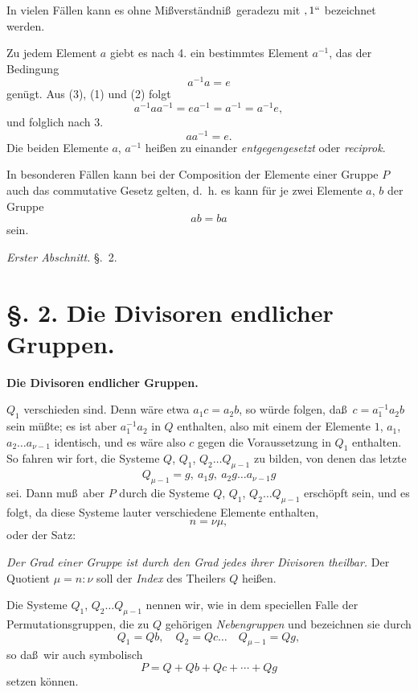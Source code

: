 \documentclass[12pt,a4paper]{book}
\begin{document}
In vielen F\"allen kann es ohne Mi\ss verst\"andni\ss\ geradezu mit $,1``$ bezeichnet werden.

Zu jedem Element $a$ giebt es nach 4. ein bestimmtes Element $a^{-1}$, das der Bedingung
\begin{equation}
a^{-1}a = e
\end{equation}
gen\"ugt. Aus (3), (1) und (2) folgt
\[a^{-1}aa^{-1} = ea^{-1} = a^{-1} = a^{-1}e,\]
und folglich nach 3.
\begin{equation}
aa^{-1} = e.
\end{equation}
Die beiden Elemente $a$, $a^{-1}$ hei\ss en zu einander \textit{entgegengesetzt} oder \textit{reciprok}.

In besonderen F\"allen kann bei der Composition der Elemente einer Gruppe $P$ auch das commutative Gesetz gelten, d.~h. es kann f\"ur je zwei Elemente $a$, $b$ der Gruppe
\[ab = ba\]
sein.

\newpage
{} \hfill \textit{Erster Abschnitt.} \hfill \S.~2.

\vspace{0.3cm}

\section*{\S. 2. Die Divisoren endlicher Gruppen.}

\begin{center}
\textbf{Die Divisoren endlicher Gruppen.}
\end{center}

$Q_1$ verschieden sind. Denn w\"are etwa $a_1c = a_2b$, so w\"urde folgen, da\ss\ $c = a_1^{-1}a_2b$ sein m\"u\ss te; es ist aber $a_1^{-1}a_2$ in $Q$ enthalten, also mit einem der Elemente $1$, $a_1$, $a_2 \ldots a_{\nu-1}$ identisch, und es w\"are also $c$ gegen die Voraussetzung in $Q_1$ enthalten. So fahren wir fort, die Systeme $Q$, $Q_1$, $Q_2 \ldots Q_{\mu-1}$ zu bilden, von denen das letzte
\[Q_{\mu-1} = g,\ a_1g,\ a_2g \ldots a_{\nu-1}g\]
sei. Dann mu\ss\ aber $P$ durch die Systeme $Q$, $Q_1$, $Q_2 \ldots Q_{\mu-1}$ ersch\"opft sein, und es folgt, da diese Systeme lauter verschiedene Elemente enthalten,
\[n = \nu\mu,\]
oder der Satz:

\textit{Der Grad einer Gruppe ist durch den Grad jedes ihrer Divisoren theilbar.} Der Quotient $\mu = n:\nu$ soll der \textit{Index} des Theilers $Q$ hei\ss en.

Die Systeme $Q_1$, $Q_2 \ldots Q_{\mu-1}$ nennen wir, wie in dem speciellen Falle der Permutationsgruppen, die zu $Q$ geh\"origen \textit{Nebengruppen} und bezeichnen sie durch
\[Q_1 = Qb,\quad Q_2 = Qc \ldots\quad Q_{\mu-1} = Qg,\]
so da\ss\ wir auch symbolisch
\[P = Q + Qb + Qc + \cdots + Qg\]
setzen k\"onnen.
\end{document}
